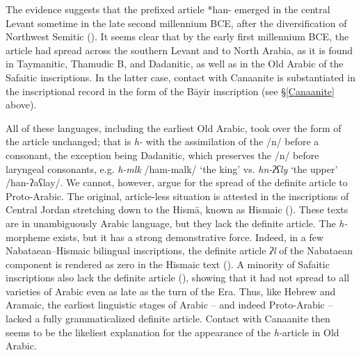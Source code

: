 \documentclass[output=paper]{langsci/langscibook}
\begin{document}
The evidence suggests that the prefixed article *han- emerged in the central Levant sometime in the late second millennium BCE, after the diversification of Northwest Semitic (\citealt{Tropper2001,Gzella2006,Pat-El2006}). It seems clear that by the early first millennium BCE, the article had spread across the southern Levant and to North Arabia, as it is found in Taymanitic, Thamudic B, and Dadanitic, as well as in the Old Arabic of the Safaitic inscriptions. In the latter case, contact with Canaanite is substantiated in the inscriptional record in the form of the Bāyir inscription (see §\ref{Canaanite} above). 

All of these languages, including the earliest Old Arabic, took over the form of the article unchanged; that is \textit{h-} with the assimilation of the /n/ before a consonant, the exception being Dadanitic, which preserves the /n/ before laryngeal consonants, e.g. \textit{h-mlk} /ham-malk/ ‘the king’ vs. \textit{hn-ʔʕly} ‘the upper’ /han-ʔaʕlay/. We cannot, however, argue for the spread of the definite article to Proto-Arabic. The original, article-less situation is attested in the inscriptions of Central Jordan stretching down to the Hismā, known as Hismaic (\citealt{GrafZwettler2004}). These texts are in unambiguously Arabic language, but they lack the definite article. The \textit{h-}morpheme exists, but it has a strong demonstrative force. Indeed, in a few Nabataean--Hismaic bilingual inscriptions, the definite article \textit{ʔl} of the Nabataean component is rendered as zero in the Hismaic text (\citealt{Hayajneh2009}). A minority of Safaitic inscriptions also lack the definite article (\citealt{Al-Jallad2018ANA}), showing that it had not spread to all varieties of Arabic even as late as the turn of the Era. Thus, like Hebrew and Aramaic, the earliest linguistic stages of Arabic – and indeed Proto-Arabic – lacked a fully grammaticalized definite article. Contact with Canaanite then seems to be the likeliest explanation for the appearance of the \textit{h-}article in Old Arabic.
\end{document}
